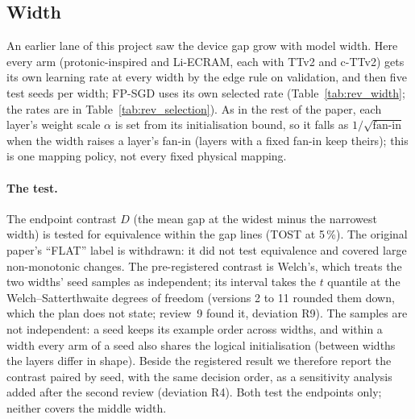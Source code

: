 \subsection{Width}\label{sec:scale}
An earlier lane of this project saw the device gap grow with model width. Here every arm (protonic-inspired and Li-ECRAM, each
with TTv2 and c-TTv2) gets its own learning rate at every width by the edge rule on validation, and then five test seeds per
width; FP-SGD uses its own selected rate (Table~\ref{tab:rev_width}; the rates are in Table~\ref{tab:rev_selection}). As in the
rest of the paper, each layer's weight scale $\alpha$ is set from its initialisation bound, so it falls as $1/\sqrt{\text{fan-in}}$
when the width raises a layer's fan-in (layers with a fixed fan-in keep theirs); this is one mapping policy, not every fixed
physical mapping.

\paragraph{The test.} The endpoint contrast $D$ (the mean gap at the widest minus the narrowest width) is tested for
equivalence within the gap lines (TOST at 5\,\%). The original paper's ``FLAT'' label is withdrawn: it did not test equivalence
and covered large non-monotonic changes. The pre-registered contrast is Welch's, which treats the two widths' seed samples as independent; its interval takes the
$t$ quantile at the Welch--Satterthwaite degrees of freedom (versions 2 to 11 rounded them down, which the plan does not
state; review~9 found it, deviation R9). The samples are not independent: a seed keeps its example order across widths, and
within a width every arm of a seed also shares the logical initialisation (between widths the layers differ in shape). Beside the
registered result we therefore report the contrast paired by seed, with the same decision order, as a sensitivity analysis
added after the second review (deviation R4). Both test the endpoints only; neither covers the middle width.

